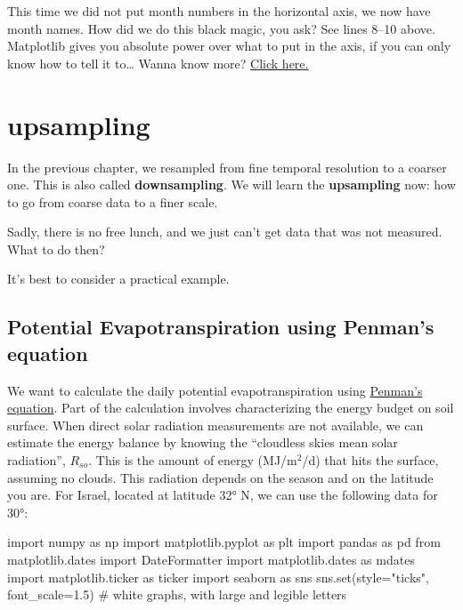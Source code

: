 \documentclass[
  letterpaper,
  DIV=11,
  numbers=noendperiod,
  oneside]{scrreprt}
\newenvironment{Shaded}{\begin{snugshade}}{\end{snugshade}}
\newcommand{\BuiltInTok}[1]{\textcolor[rgb]{0.00,0.23,0.31}{#1}}
\newcommand{\CommentTok}[1]{\textcolor[rgb]{0.37,0.37,0.37}{#1}}
\newcommand{\FloatTok}[1]{\textcolor[rgb]{0.68,0.00,0.00}{#1}}
\newcommand{\ImportTok}[1]{\textcolor[rgb]{0.00,0.46,0.62}{#1}}
\newcommand{\NormalTok}[1]{\textcolor[rgb]{0.00,0.23,0.31}{#1}}
\newcommand{\OperatorTok}[1]{\textcolor[rgb]{0.37,0.37,0.37}{#1}}
\newcommand{\StringTok}[1]{\textcolor[rgb]{0.13,0.47,0.30}{#1}}
\begin{document}
This time we did not put month numbers in the horizontal axis, we now
have month names. How did we do this black magic, you ask? See lines
8--10 above. Matplotlib gives you absolute power over what to put in the
axis, if you can only know how to tell it to\ldots{} Wanna know more?
\href{/best-practices/date-formatting.ipynb}{Click here.}

\hypertarget{upsampling}{%
\chapter{upsampling}\label{upsampling}}

In the previous chapter, we resampled from fine temporal resolution to a
coarser one. This is also called \textbf{downsampling}. We will learn
the \textbf{upsampling} now: how to go from coarse data to a finer
scale.

Sadly, there is no free lunch, and we just can't get data that was not
measured. What to do then?

It's best to consider a practical example.

\hypertarget{potential-evapotranspiration-using-penmans-equation}{%
\section{Potential Evapotranspiration using Penman's
equation}\label{potential-evapotranspiration-using-penmans-equation}}

We want to calculate the daily potential evapotranspiration using
\href{http://yairmau.com/surface-hydrology/evapotranspiration/evapotranspiration-lecture.html\#net-radiation}{Penman's
equation}. Part of the calculation involves characterizing the energy
budget on soil surface. When direct solar radiation measurements are not
available, we can estimate the energy balance by knowing the ``cloudless
skies mean solar radiation'', \(R_{so}\). This is the amount of energy
(MJ/m\(^2\)/d) that hits the surface, assuming no clouds. This radiation
depends on the season and on the latitude you are. For Israel, located
at latitude 32° N, we can use the following data for 30°:

\begin{Shaded}
\begin{Highlighting}[]
\ImportTok{import}\NormalTok{ numpy }\ImportTok{as}\NormalTok{ np}
\ImportTok{import}\NormalTok{ matplotlib.pyplot }\ImportTok{as}\NormalTok{ plt}
\ImportTok{import}\NormalTok{ pandas }\ImportTok{as}\NormalTok{ pd}
\ImportTok{from}\NormalTok{ matplotlib.dates }\ImportTok{import}\NormalTok{ DateFormatter}
\ImportTok{import}\NormalTok{ matplotlib.dates }\ImportTok{as}\NormalTok{ mdates}
\ImportTok{import}\NormalTok{ matplotlib.ticker }\ImportTok{as}\NormalTok{ ticker}
\ImportTok{import}\NormalTok{ seaborn }\ImportTok{as}\NormalTok{ sns}
\NormalTok{sns.}\BuiltInTok{set}\NormalTok{(style}\OperatorTok{=}\StringTok{"ticks"}\NormalTok{, font\_scale}\OperatorTok{=}\FloatTok{1.5}\NormalTok{)  }\CommentTok{\# white graphs, with large and legible letters}
\end{Highlighting}
\end{Shaded}
\end{document}
